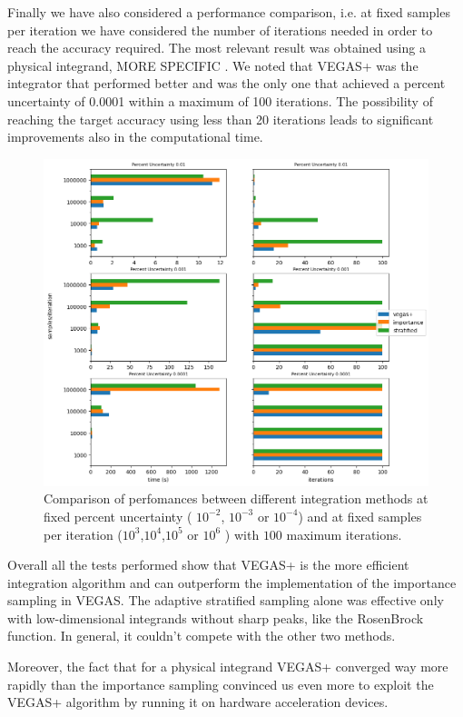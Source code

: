 \documentclass[../main/main.tex]{subfiles}
\begin{document}
Finally we have also considered a performance comparison, i.e. at fixed samples per iteration we have considered the number of iterations needed in order to reach the accuracy required.
The most relevant result was obtained using a physical integrand, MORE SPECIFIC .
We noted that VEGAS+ was the integrator that performed better and was the only one that achieved a percent uncertainty of 0.0001 within a maximum of 100 iterations.
The possibility of reaching the target accuracy using less than 20 iterations leads to significant improvements also in the computational time. 

\begin{figure}
	\centering
	\includegraphics[width=15cm]{../../../tests/performance_plots/dy_aa.png}
	\caption{Comparison of perfomances between different integration methods at fixed percent uncertainty ( $10^{-2}$, $10^{-3}$ or $10^{-4}$) and at fixed samples per iteration ($10^3$,$10^4$,$10^5$ or $10^6$ ) with $100$ maximum iterations.}
	\label{dy_aa}
\end{figure}

Overall all the tests performed show that VEGAS+ is  the more efficient integration algorithm and can outperform the implementation of the importance sampling in VEGAS. The adaptive stratified sampling alone was effective only with low-dimensional integrands without sharp peaks, like the RosenBrock function. In general, it couldn't compete with the other two methods.

Moreover, the fact that for a physical integrand VEGAS+ converged way more rapidly than the importance sampling convinced us even more to exploit the VEGAS+ algorithm by running it on hardware acceleration devices.
\end{document}

